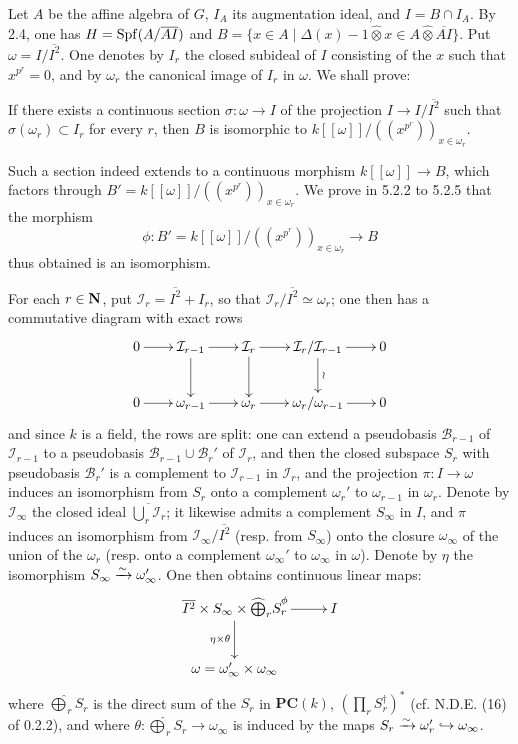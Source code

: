 Let $A$ be the affine algebra of $G$, $I_A$ its augmentation ideal, and $I=B\cap I_A$. By 2.4, one has $H=\operatorname{Spf}(A/\overline{AI})$ and $B=\{x\in A\mid\Delta(x)-1\widehat\otimes x\in A\widehat\otimes\overline{AI}\}$. Put $\omega=I/\overline{I^2}$. One denotes by $I_r$ the closed subideal of $I$ consisting of the $x$ such that $x^{p^r}=0$, and by $\omega_r$ the canonical image of $I_r$ in $\omega$. We shall prove:
\begin{proposition}{}
If there exists a continuous section $\sigma:\omega\to I$ of the projection $I\to I/\overline{I^2}$ such that $\sigma(\omega_r)\subset I_r$ for every $r$, then $B$ is isomorphic to $k[[\omega]]/((x^{p^r}))_{x\in\omega_r}$.
\end{proposition}
Such a section indeed extends to a continuous morphism $k[[\omega]]\to B$, which factors through $B'=k[[\omega]]/((x^{p^r}))_{x\in\omega_r}$. We prove in 5.2.2 to 5.2.5 that the morphism
\[
\phi:B'=k[[\omega]]/((x^{p^r}))_{x\in\omega_r}\longrightarrow B
\]
thus obtained is an isomorphism.

\label{VIIB.5.2.1.A}For each $r\in\mathbf{N}$, put $\mathcal I_r=\overline{I^2}+I_r$, so that $\mathcal I_r/\overline{I^2}\simeq\omega_r$; one then has a commutative diagram with exact rows
\[
\xymatrix@C=20pt@R=24pt{
0\ar[r]&\mathcal I_{r-1}\ar[r]\ar[d]&\mathcal I_r\ar[r]\ar[d]&\mathcal I_r/\mathcal I_{r-1}\ar[r]\ar[d]^\wr&0\\
0\ar[r]&\omega_{r-1}\ar[r]&\omega_r\ar[r]&\omega_r/\omega_{r-1}\ar[r]&0}
\]
and since $k$ is a field, the rows are split: one can extend a pseudobasis $\mathscr B_{r-1}$ of $\mathcal I_{r-1}$ to a pseudobasis $\mathscr B_{r-1}\cup\mathscr B_r'$ of $\mathcal I_r$, and then the closed subspace $S_r$ with pseudobasis $\mathscr B_r'$ is a complement to $\mathcal I_{r-1}$ in $\mathcal I_r$, and the projection $\pi:I\to\omega$ induces an isomorphism from $S_r$ onto a complement $\omega_r'$ to $\omega_{r-1}$ in $\omega_r$. Denote by $\mathcal I_\infty$ the closed ideal $\overline{\bigcup_r\mathcal I_r}$; it likewise admits a complement $S_\infty$ in $I$, and $\pi$ induces an isomorphism from $\mathcal I_\infty/\overline{I^2}$ (resp. from $S_\infty$) onto the closure $\omega_\infty$ of the union of the $\omega_r$ (resp. onto a complement $\omega_\infty'$ to $\omega_\infty$ in $\omega$). Denote by $\eta$ the isomorphism $S_\infty\xrightarrow{\sim}\omega_\infty'$. One then obtains continuous linear maps:
\[
\xymatrix@C=25pt@R=25pt{
\overline{I^2}\times S_\infty\times\widehat{\bigoplus}_r S_r\ar[r]^\phi\ar[d]_{\eta\times\theta}&I\\
\omega=\omega_\infty'\times\omega_\infty&}
\]
where $\widehat{\bigoplus}_r S_r$ is the direct sum of the $S_r$ in $\mathbf{PC}(k)$, \ie $(\prod_r S_r^\dagger)^*$ (cf. N.D.E. (16) of 0.2.2), and where $\theta:\widehat{\bigoplus}_r S_r\to\omega_\infty$ is induced by the maps $S_r\xrightarrow{\sim}\omega_r'\hookrightarrow\omega_\infty$.
